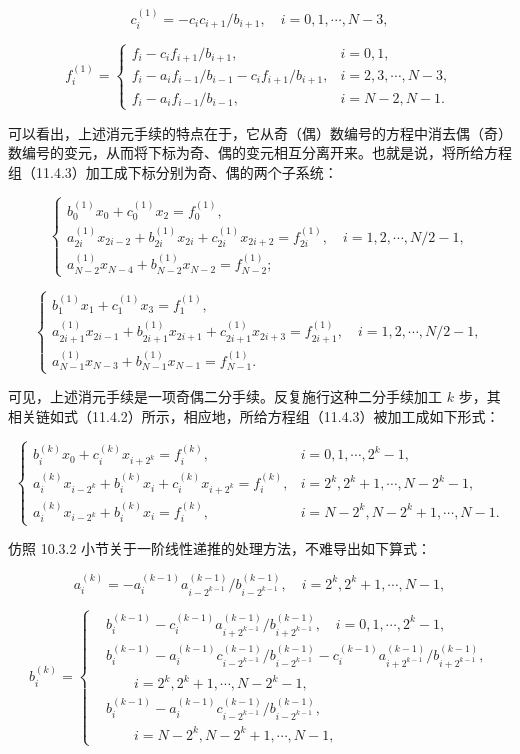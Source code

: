 \[
c_i^{(1)}=-c_i c_{i+1}/b_{i+1},\quad i=0,1,\cdots,N-3,
\]

\[
f_i^{(1)}=
\begin{cases}
f_i-c_i f_{i+1}/b_{i+1},& i=0,1,\\
f_i-a_i f_{i-1}/b_{i-1}-c_i f_{i+1}/b_{i+1},& i=2,3,\cdots,N-3,\\
f_i-a_i f_{i-1}/b_{i-1},& i=N-2,N-1.
\end{cases}
\]

可以看出，上述消元手续的特点在于，它从奇（偶）数编号的方程中消去偶（奇）数编号的变元，从而将下标为奇、偶的变元相互分离开来。也就是说，将所给方程组（11.4.3）加工成下标分别为奇、偶的两个子系统：

\[
\begin{cases}
b_0^{(1)}x_0+c_0^{(1)}x_2=f_0^{(1)},\\
a_{2i}^{(1)}x_{2i-2}+b_{2i}^{(1)}x_{2i}+c_{2i}^{(1)}x_{2i+2}=f_{2i}^{(1)},\quad i=1,2,\cdots,N/2-1,\\
a_{N-2}^{(1)}x_{N-4}+b_{N-2}^{(1)}x_{N-2}=f_{N-2}^{(1)};
\end{cases}
\]

\[
\begin{cases}
b_1^{(1)}x_1+c_1^{(1)}x_3=f_1^{(1)},\\
a_{2i+1}^{(1)}x_{2i-1}+b_{2i+1}^{(1)}x_{2i+1}+c_{2i+1}^{(1)}x_{2i+3}=f_{2i+1}^{(1)},\quad i=1,2,\cdots,N/2-1,\\
a_{N-1}^{(1)}x_{N-3}+b_{N-1}^{(1)}x_{N-1}=f_{N-1}^{(1)}.
\end{cases}
\]

可见，上述消元手续是一项奇偶二分手续。反复施行这种二分手续加工 \(k\) 步，其相关链如式（11.4.2）所示，相应地，所给方程组（11.4.3）被加工成如下形式：

\[
\begin{cases}
b_i^{(k)}x_0+c_i^{(k)}x_{i+2^k}=f_i^{(k)},& i=0,1,\cdots,2^k-1,\\
a_i^{(k)}x_{i-2^k}+b_i^{(k)}x_i+c_i^{(k)}x_{i+2^k}=f_i^{(k)},& i=2^k,2^k+1,\cdots,N-2^k-1,\\
a_i^{(k)}x_{i-2^k}+b_i^{(k)}x_i=f_i^{(k)},& i=N-2^k,N-2^k+1,\cdots,N-1.
\end{cases}
\]

仿照 10.3.2 小节关于一阶线性递推的处理方法，不难导出如下算式：

\[
a_i^{(k)}=-a_i^{(k-1)}a_{i-2^{k-1}}^{(k-1)}/b_{i-2^{k-1}}^{(k-1)},\quad i=2^k,2^k+1,\cdots,N-1,
\]

\[
b_i^{(k)}=
\left\{
\begin{aligned}
&b_i^{(k-1)}-c_i^{(k-1)}a_{i+2^{k-1}}^{(k-1)}/b_{i+2^{k-1}}^{(k-1)},\quad i=0,1,\cdots,2^k-1,\\
&b_i^{(k-1)}-a_i^{(k-1)}c_{i-2^{k-1}}^{(k-1)}/b_{i-2^{k-1}}^{(k-1)}-c_i^{(k-1)}a_{i+2^{k-1}}^{(k-1)}/b_{i+2^{k-1}}^{(k-1)},\\
&\qquad i=2^k,2^k+1,\cdots,N-2^k-1,\\
&b_i^{(k-1)}-a_i^{(k-1)}c_{i-2^{k-1}}^{(k-1)}/b_{i-2^{k-1}}^{(k-1)},\\
&\qquad i=N-2^k,N-2^k+1,\cdots,N-1,
\end{aligned}
\right.
\]

